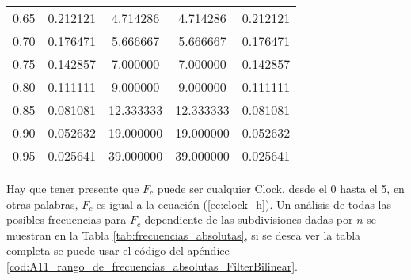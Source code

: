 \begin{table}[!hbp]
\begin{tabular}{ccccc}
0.65 & 0.212121 & 4.714286 & 4.714286 & 0.212121 \\  
                                             
0.70 & 0.176471 & 5.666667 & 5.666667 & 0.176471 \\  
                                              
0.75 & 0.142857 & 7.000000 & 7.000000 & 0.142857 \\  
                                              
0.80 & 0.111111 & 9.000000 & 9.000000 & 0.111111 \\  
                                             
0.85 & 0.081081 & 12.333333 & 12.333333 & 0.081081 \\
                                              
0.90 & 0.052632 & 19.000000 & 19.000000 & 0.052632 \\
                                              
0.95 & 0.025641 & 39.000000 & 39.000000 & 0.025641 \\
\hline                                              
\end{tabular}                                                                
\end{table} 
  

Hay que tener presente que $F_{c}$ puede ser cualquier Clock, desde el 0 hasta el 5, en otras palabras, $F_{c}$ es igual a la ecuación (\ref{ec:clock_h}). Un análisis de todas las posibles frecuencias para $F_{c}$ dependiente de las subdivisiones dadas por $n$ se muestran en la Tabla \ref{tab:frecuencias_absolutas}, si se desea ver la tabla completa se puede usar el código del apéndice \ref{cod:A11_rango_de_frecuencias_absolutas_FilterBilinear}. 

